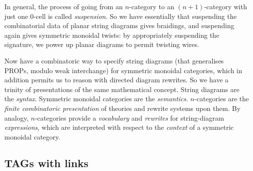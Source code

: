 In general, the process of going from an $n$-category to an $(n + 1)$-category with just one 0-cell is called \emph{suspension}. So we have essentially that suspending the combinatorial data of planar string diagrams gives braidings, and suspending again gives symmetric monoidal twists: by appropriately suspending the signature, we power up planar diagrams to permit twisting wires.\\

\begin{remark}
Now have a combinatoric way to specify string diagrams (that generalises PROPs, modulo weak interchange) for symmetric monoidal categories, which in addition permits us to reason with directed diagram rewrites. So we have a trinity of presentations of the same mathematical concept. String diagrams are the \emph{syntax}. Symmetric monoidal categories are the \emph{semantics}. $n$-categories are the \emph{finite combinatoric presentation} of theories and rewrite systems upon them. By analogy, $n$-categories provide a \emph{vocabulary} and \emph{rewrites} for string-diagram \emph{expressions}, which are interpreted with respect to the \emph{context} of a symmetric monoidal category.
\end{remark}

\subsection{TAGs with links}


